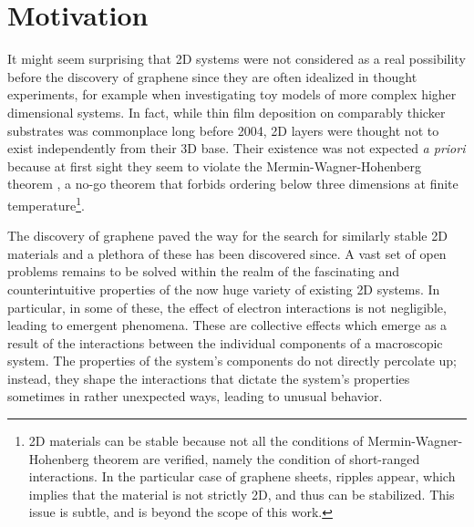 \section{Motivation}
\label{sec:motivation}

It might seem surprising that \ac{2D} systems were not considered as a real possibility before the discovery of graphene since they are often idealized in thought experiments, for example when investigating toy models of more complex higher dimensional systems.
In fact, while thin film deposition on comparably thicker substrates was commonplace long before 2004, \ac{2D} layers were thought not to exist independently from their 3D base.
Their existence was not expected \emph{a priori} because at first sight they seem to violate the Mermin-Wagner-Hohenberg theorem \cite{mermin_absence_1966, coleman_there_1973, hohenberg_existence_1967}, a no-go theorem that forbids ordering below three dimensions at finite temperature\footnote{\ac{2D} materials can be stable because not all the conditions of Mermin-Wagner-Hohenberg theorem are verified, namely the condition of short-ranged interactions. In the particular case of graphene sheets, ripples appear, which implies that the material is not strictly \ac{2D}, and thus can be stabilized. This issue is subtle, and is beyond the scope of this work.}.

The discovery of graphene paved the way for the search for similarly stable \ac{2D} materials and a plethora of these has been discovered since.
A vast set of open problems remains to be solved within the realm of the fascinating and counterintuitive properties of the now huge variety of existing \ac{2D} systems.
In particular, in some of these, the effect of electron interactions is not negligible, leading to emergent phenomena.
These are collective effects which emerge as a result of the interactions between the individual components of a macroscopic system.
The properties of the system's components do not directly percolate up; instead, they shape the interactions that dictate the system's properties sometimes in rather unexpected ways, leading to unusual behavior.

